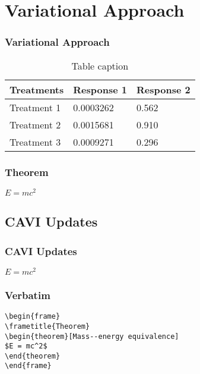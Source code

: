\documentclass{beamer}
\begin{document}
\section{Variational Approach}

\begin{frame}
\frametitle{Variational Approach}
\begin{table}
\begin{tabular}{l l l}
\toprule
\textbf{Treatments} & \textbf{Response 1} & \textbf{Response 2}\\
\midrule
Treatment 1 & 0.0003262 & 0.562 \\
Treatment 2 & 0.0015681 & 0.910 \\
Treatment 3 & 0.0009271 & 0.296 \\
\bottomrule
\end{tabular}
\caption{Table caption}
\end{table}
\end{frame}


\begin{frame}
\frametitle{Theorem}
\begin{theorem}
$E = mc^2$
\end{theorem}
\end{frame}

\subsection{CAVI Updates}

\begin{frame}
\frametitle{CAVI Updates}
\begin{theorem}
$E = mc^2$
\end{theorem}
\end{frame}


\begin{frame}[fragile] %
\frametitle{Verbatim}
\begin{example}
\begin{verbatim}
\begin{frame}
\frametitle{Theorem}
\begin{theorem}[Mass--energy equivalence]
$E = mc^2$
\end{theorem}
\end{frame}\end{verbatim}
\end{example}
\end{frame}
\end{document}
